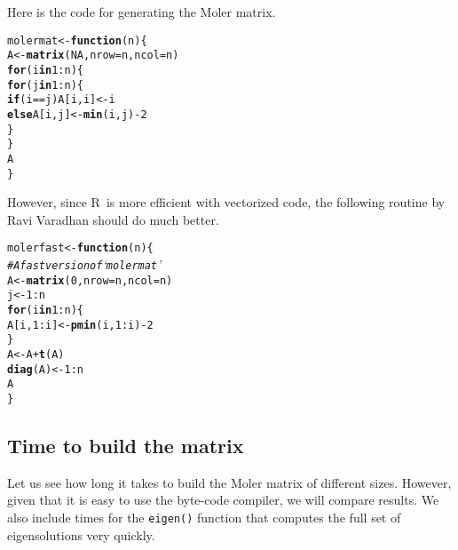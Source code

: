 \documentclass[10pt]{article}\usepackage[]{graphicx}\usepackage[]{color}
\makeatletter
\newcommand{\hlnum}[1]{\textcolor[rgb]{0.686,0.059,0.569}{#1}}%
\newcommand{\hlcom}[1]{\textcolor[rgb]{0.678,0.584,0.686}{\textit{#1}}}%
\newcommand{\hlopt}[1]{\textcolor[rgb]{0,0,0}{#1}}%
\newcommand{\hlstd}[1]{\textcolor[rgb]{0.345,0.345,0.345}{#1}}%
\newcommand{\hlkwa}[1]{\textcolor[rgb]{0.161,0.373,0.58}{\textbf{#1}}}%
\newcommand{\hlkwb}[1]{\textcolor[rgb]{0.69,0.353,0.396}{#1}}%
\newcommand{\hlkwc}[1]{\textcolor[rgb]{0.333,0.667,0.333}{#1}}%
\newcommand{\hlkwd}[1]{\textcolor[rgb]{0.737,0.353,0.396}{\textbf{#1}}}%
\newenvironment{kframe}{%
 \def\at@end@of@kframe{}%
 \ifinner\ifhmode%
  \def\at@end@of@kframe{\end{minipage}}%
  \begin{minipage}{\columnwidth}%
 \fi\fi%
 \def\FrameCommand##1{\hskip\@totalleftmargin \hskip-\fboxsep
 \colorbox{shadecolor}{##1}\hskip-\fboxsep
     \hskip-\linewidth \hskip-\@totalleftmargin \hskip\columnwidth}%
 \MakeFramed {\advance\hsize-\width
   \@totalleftmargin\z@ \linewidth\hsize
   \@setminipage}}%
 {\par\unskip\endMakeFramed%
 \at@end@of@kframe}
\newenvironment{knitrout}{}{} %
\newcommand{\R}{{\sf R\ }}
\newcommand{\code}[1]{{\tt #1}}
\makeatother
\begin{document}
Here is the code for generating the Moler matrix.

\begin{knitrout}\scriptsize
{}\color{fgcolor}\begin{kframe}
\begin{alltt}
\hlstd{molermat}\hlkwb{<-}\hlkwa{function}\hlstd{(}\hlkwc{n}\hlstd{)\{}
   \hlstd{A}\hlkwb{<-}\hlkwd{matrix}\hlstd{(}\hlnum{NA}\hlstd{,} \hlkwc{nrow}\hlstd{=n,} \hlkwc{ncol}\hlstd{=n)}
   \hlkwa{for} \hlstd{(i} \hlkwa{in} \hlnum{1}\hlopt{:}\hlstd{n)\{}
      \hlkwa{for} \hlstd{(j} \hlkwa{in} \hlnum{1}\hlopt{:}\hlstd{n) \{}
          \hlkwa{if} \hlstd{(i} \hlopt{==} \hlstd{j) A[i,i]}\hlkwb{<-}\hlstd{i}
          \hlkwa{else} \hlstd{A[i,j]}\hlkwb{<-}\hlkwd{min}\hlstd{(i,j)} \hlopt{-} \hlnum{2}
      \hlstd{\}}
   \hlstd{\}}
   \hlstd{A}
\hlstd{\}}
\end{alltt}
\end{kframe}
\end{knitrout}

However, since \R is more efficient with vectorized code, the following routine by 
Ravi Varadhan should do much better.

\begin{knitrout}\scriptsize
{}\color{fgcolor}\begin{kframe}
\begin{alltt}
\hlstd{molerfast} \hlkwb{<-} \hlkwa{function}\hlstd{(}\hlkwc{n}\hlstd{) \{}
\hlcom{# A fast version of `molermat'}
\hlstd{A} \hlkwb{<-} \hlkwd{matrix}\hlstd{(}\hlnum{0}\hlstd{,} \hlkwc{nrow} \hlstd{= n,} \hlkwc{ncol} \hlstd{= n)}
\hlstd{j} \hlkwb{<-} \hlnum{1}\hlopt{:}\hlstd{n}
\hlkwa{for} \hlstd{(i} \hlkwa{in} \hlnum{1}\hlopt{:}\hlstd{n) \{}
\hlstd{A[i,} \hlnum{1}\hlopt{:}\hlstd{i]} \hlkwb{<-} \hlkwd{pmin}\hlstd{(i,} \hlnum{1}\hlopt{:}\hlstd{i)} \hlopt{-} \hlnum{2}
\hlstd{\}}
\hlstd{A} \hlkwb{<-} \hlstd{A} \hlopt{+} \hlkwd{t}\hlstd{(A)}
\hlkwd{diag}\hlstd{(A)} \hlkwb{<-} \hlnum{1}\hlopt{:}\hlstd{n}
\hlstd{A}
\hlstd{\}}
\end{alltt}
\end{kframe}
\end{knitrout}

\subsection{Time to build the matrix}

Let us see how long it takes to build the Moler matrix of different sizes.
However, given that it is easy to use the byte-code compiler, we will compare
results. We also include times for the \code{eigen()} function that computes
the full set of eigensolutions very quickly.
\end{document}
